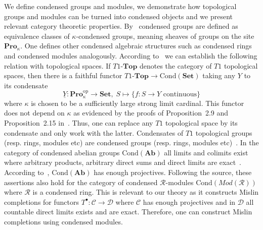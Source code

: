 \documentclass[12pt,a4paper]{article}
\numberwithin{equation}{section}
\theoremstyle{nonumberplain}
\begin{document}
We define condensed groups and modules, we demonstrate how topological groups and modules can be turned into condensed objects and we present relevant category theoretic properties. By~\cite[p.~7]{sch19} condensed groups are defined as equivalence classes of $\kappa$-condensed groups, meaning sheaves of groups on the site $\mathbf{Pro}_{\kappa}$. One defines other condensed algebraic structures such as condensed rings and condensed modules analogously. According to~\cite[p.~15/16 and Proposition~1.7]{sch19} we can establish the following relation with topological spaces. If $T1\text{-}\mathbf{Top}$ denotes the category of $T1$ topological spaces, then there is a faithful functor $T1\text{-}\mathbf{Top} \rightarrow \mathrm{Cond}(\mathbf{Set})$ taking any $Y$ to its condensate
\[ \underline{Y}: \mathbf{Pro}_{\kappa}^{\mathrm{op}} \rightarrow \mathbf{Set}, \; S \mapsto \lbrace f: S \rightarrow Y \text{ continuous} \rbrace \]
where $\kappa$ is chosen to be a sufficiently large strong limit cardinal. This functor does not depend on $\kappa$ as evidenced by the proofs of Proposition~2.9 and Proposition~2.15 in~\cite{sch19}. Thus, one can replace any $T1$ topological space by its condensate and only work with the latter. Condensates of $T1$ topological groups (resp.\! rings, modules etc) are condensed groups (resp.\! rings, modules etc)~\cite[p.~8]{sch19}. In the category of condensed abelian groups $\mathrm{Cond}(\mathbf{Ab})$ all limits and colimits exist where arbitrary products, arbitrary direct sums and direct limits are exact~\cite[Theorem~1.10]{sch19}. According to~\cite[p.~12]{sch19}, $\mathrm{Cond}(\mathbf{Ab})$ has enough projectives. Following the source, these assertions also hold for the category of condensed $\mathcal{R}$-modules $\mathrm{Cond}(Mod(\mathcal{R}))$ where $\mathcal{R}$ is a condensed ring. This is relevant to our theory as it constructs Mislin completions for functors $T^{\bullet}: \mathcal{C} \rightarrow \mathcal{D}$ where $\mathcal{C}$ has enough projectives and in $\mathcal{D}$ all countable direct limits exists and are exact. Therefore, one can construct Mislin completions using condensed modules. \\
\end{document}
